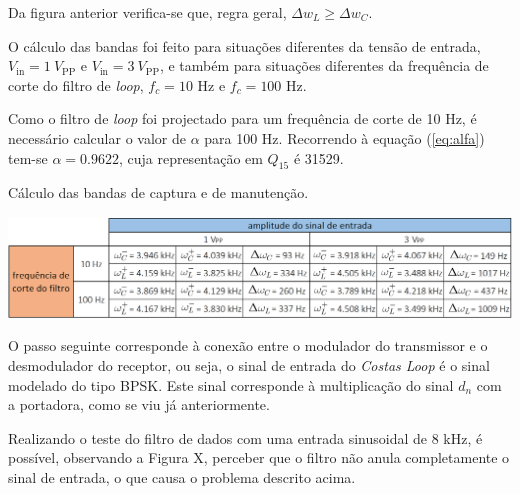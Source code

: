 \documentclass[11pt]{article}
\numberwithin{equation}{section}
\begin{document}
Da figura anterior verifica-se que, regra geral, $\Delta w_L \geq \Delta w_C$.

O cálculo das bandas foi feito para situações diferentes da tensão de entrada, $V_{\text{in}} = 1~V_{\text{PP}}$ e $V_{\text{in}} = 3~V_{\text{PP}}$, e também para situações diferentes da frequência de corte do filtro de \textit{loop}, $f_{c} = 10$ Hz e $f_{c} = 100$ Hz.

Como o filtro de \textit{loop} foi projectado para um frequência de corte de 10 Hz, é necessário calcular o valor de $\alpha$ para 100 Hz. Recorrendo à equação (\ref{eq:alfa}) tem-se $\alpha = 0.9622$, cuja representação em $Q_{15}$ é 31529. 

\begin{table}[H]
	\centering
	\caption{Cálculo das bandas de captura e de manutenção.}
	\vspace{-1.5mm}
	\includegraphics[keepaspectratio=true, scale=0.35]{tabelas/bandas}
\end{table}


O passo seguinte corresponde à conexão entre o modulador do transmissor e o desmodulador do receptor, ou seja, o sinal de entrada do \textit{Costas Loop} é o sinal modelado do tipo BPSK. Este sinal corresponde à multiplicação do sinal $d_n$ com a portadora, como se viu já anteriormente.



Realizando o teste do filtro de dados com uma entrada sinusoidal de 8 kHz, é possível, observando a Figura X, perceber que o filtro não anula completamente o sinal de entrada, o que causa o problema descrito acima. 
\end{document}
